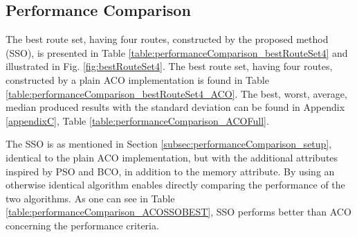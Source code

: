 \subsection{Performance Comparison}
\label{subsec:performanceComparisonDiscussion}


The best route set, having four routes, constructed by the proposed method (SSO), is presented in Table \vref{table:performanceComparison_bestRouteSet4} and illustrated in Fig. \vref{fig:bestRouteSet4}. The best route set, having four routes, constructed by a plain ACO implementation is found in Table \vref{table:performanceComparison_bestRouteSet4_ACO}. The best, worst, average, median produced results with the standard deviation can be found in Appendix \ref{appendixC}, Table \vref{table:performanceComparison_ACOFull}. 

The SSO is as mentioned in Section \vref{subsec:performanceComparison_setup}, identical to the plain ACO implementation, but with the additional attributes inspired by PSO and BCO, in addition to the memory attribute. By using an otherwise identical algorithm enables directly comparing the performance of the two algorithms. As one can see in Table \vref{table:performanceComparison_ACOSSOBEST}, SSO performs better than ACO concerning the performance criteria. 

